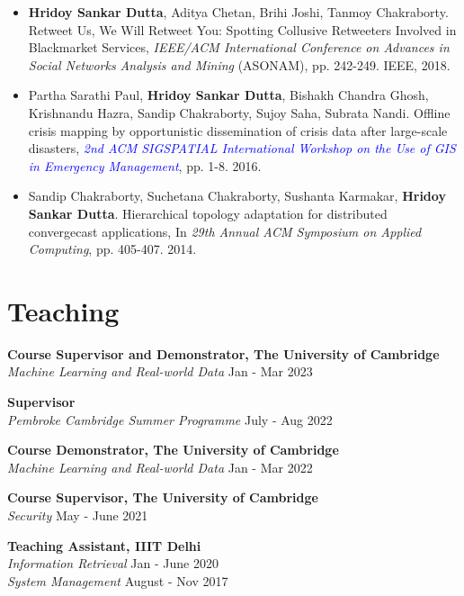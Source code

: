 \documentclass[margin, centered,lmodern]{res}
\begin{document}
\begin{resume}
\begin{itemize}[leftmargin=*]
\item \textbf{Hridoy Sankar Dutta}, Aditya Chetan, Brihi Joshi, Tanmoy Chakraborty. Retweet Us, We Will Retweet You: Spotting Collusive Retweeters Involved in Blackmarket Services, \textit{IEEE/ACM International Conference on Advances in Social Networks Analysis and Mining} (ASONAM), pp. 242-249. IEEE, 2018.

\item Partha Sarathi Paul, \textbf{Hridoy Sankar Dutta}, Bishakh Chandra Ghosh, Krishnandu Hazra, Sandip Chakraborty, Sujoy Saha, Subrata Nandi. Offline crisis mapping by opportunistic dissemination of crisis data after large-scale disasters, \textit{\textcolor{blue}{2nd ACM SIGSPATIAL International Workshop on the Use of GIS in Emergency Management}}, pp. 1-8. 2016.

\item Sandip Chakraborty, Suchetana Chakraborty, Sushanta Karmakar, \textbf{Hridoy Sankar Dutta}. Hierarchical topology adaptation for distributed convergecast applications, In \textit{29th Annual ACM Symposium on Applied Computing}, pp. 405-407. 2014.\end{itemize}


\section{Teaching}
\textbf{Course Supervisor and Demonstrator, The University of Cambridge} \\
\emph{Machine Learning and Real-world Data} \hfill Jan - Mar 2023

\textbf{Supervisor} \\
\emph{Pembroke Cambridge Summer Programme} \hfill July - Aug 2022

\textbf{Course Demonstrator, The University of Cambridge} \\
\emph{Machine Learning and Real-world Data} \hfill Jan - Mar 2022

\textbf{Course Supervisor, The University of Cambridge} \\
\emph{Security} \hfill May - June 2021

\textbf{Teaching Assistant, IIIT Delhi} \\
\emph{Information Retrieval} \hfill Jan - June 2020 \\
\emph{System Management} \hfill August - Nov 2017



\end{resume}
\end{document}
